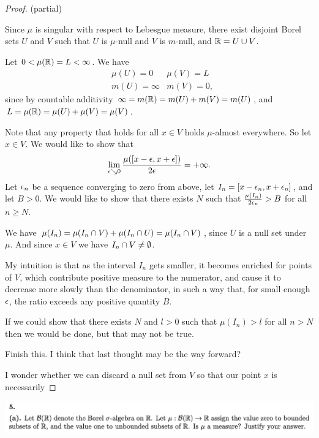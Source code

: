 \begin{proof}
   (partial)

  Since $\mu$ is singular with respect to Lebesgue measure, there exist disjoint Borel sets $U$ and $V$ such
  that $U$ is $\mu$-null and $V$ is $m$-null, and $\mathbb{R} = U \cup V$.

  Let $0 < \mu(\mathbb{R}) = L < \infty$. We have
  \begin{align*}
    &\mu(U) = 0     & \mu(V) = L \\
    &m(U) = \infty & m(V) = 0,
  \end{align*}
  since by countable additivity $\infty = m(\mathbb{R}) = m(U) + m(V) = m(U)$,
  and $L = \mu(\mathbb{R}) = \mu(U) + \mu(V) = \mu(V)$.

  Note that any property that holds for all $x \in V$ holds $\mu$-almost everywhere. So let $x \in V$. We would
  like to show that
  \begin{align*}
    \lim_{\eps \searrow 0} \frac{\mu([x - \eps, x + \eps])}{2\eps} = +\infty.
  \end{align*}
  Let $\epsilon_n$ be a sequence converging to zero from above, let $I_n = [x - \epsilon_n, x + \epsilon_n]$, and
  let $B > 0$. We would like to show that there exists $N$ such that $\frac{\mu(I_n)}{2\epsilon_n} > B$ for
  all $n \geq N$.

  We have $\mu(I_n) = \mu(I_n \cap V) + \mu(I_n \cap U) = \mu(I_n \cap V)$, since $U$ is a null set
  under $\mu$. And since $x \in V$ we have $I_n \cap V \neq \emptyset$.

  My intuition is that as the interval $I_n$ gets smaller, it becomes enriched for points of $V$, which
  contribute positive measure to the numerator, and cause it to decrease more slowly than the denominator, in
  such a way that, for small enough $\epsilon$, the ratio exceeds any positive quantity $B$.

  If we could show that there exists $N$ and $l > 0$ such that $\mu(I_n) > l$ for all $n > N$ then we
  would be done, but that may not be true.

   Finish this. I think that last thought may be the way forward?

  I wonder whether we can discard a null set from $V$ so that our point $x$ is necessarily
\end{proof}


\newpage
\begin{mdframed}
\includegraphics[width=400pt]{img/analysis--berkeley-202a-final-246a.png}
\end{mdframed}

